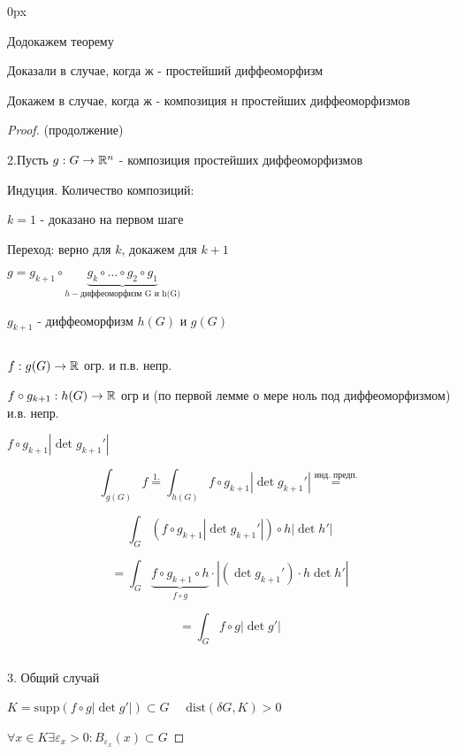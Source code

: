 
\parindent 0px

\usepackage{amsfonts, amssymb, amsmath, mathtools, amsthm}  %
\usepackage{mathrsfs}


\renewcommand{\baselinestretch}{1.3} 
\setcounter{lemma}{14}


    Додокажем теорему

    Доказали в случае, когда ж - простейший диффеоморфизм 
    
    Докажем в случае, когда ж - композиция н простейших диффеоморфизмов
    
    \begin{proof} (продолжение)
        
        2.Пусть $g: G \to \mathbb{R}^n$ - композиция простейших диффеоморфизмов
        
        Индуция. Количество композиций: 
        
        $k=1$ - доказано на первом шаге

        Переход: верно для $k$, докажем для $k+1$

        $g = g_{k+1}\circ \underbrace{g_k \circ \dotsc \circ g_2 \circ g_1}_{h - \text{диффеоморфизм G и h(G)}}$

        $g_{k+1}$ - диффеоморфизм $h(G)$ и $g(G)$

        \par $ $

        $f: g(G) \to \mathbb{R} $ огр. и п.в. непр.

        $f\circ g_{k+1}:h(G) \to \mathbb{R}$ огр и (по первой лемме о мере ноль под диффеоморфизмом) и.в. непр.

        $f\circ g_{k+1} |\det g_{k+1}'|$

        $$\int_{g(G)} f \overset{1.}{=} \int_{h(G)} f \circ g_{k+1} | \det g_{k+1}'| \overset{\text{инд. предп.}}{=} $$

        $$\int_G (f\circ g_{k+1} | \det g_{k+1}'|) \circ h |\det h'|$$

        $$= \int_G \underbrace{f\circ g_{k+1}\circ h}_{f \circ g} \cdot | (\det g_{k+1}') \cdot h\det h'|$$

        $$=\int_G f \circ g |\det g'|$$

        \par $ $

        3. Общий случай

        $K = \text{supp}(f\circ g | \det g'|) \subset G \quad $
        $\text{dist}(\delta G, K) > 0$

        $\forall x \in K \exists \varepsilon_x > 0: B_{\varepsilon_x}(x) \subset G$


\end{proof}

